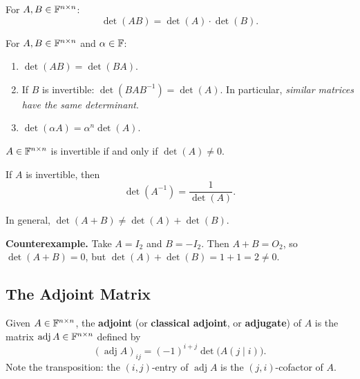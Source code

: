 \begin{propbox}
\label{prop:det-product}
For $A,B\in\mathbb{F}^{n\times n}$:
\[
    \det(AB) = \det(A)\cdot\det(B).
\]
\end{propbox}

\begin{corbox}
\label{cor:det-properties}
For $A,B\in\mathbb{F}^{n\times n}$ and $\alpha\in\mathbb{F}$:
\begin{enumerate}[label=\textbf{(\roman*)}]
    \item $\det(AB)=\det(BA)$.
    \item If $B$ is invertible: $\det(BAB^{-1})=\det(A)$.  In particular,
          \emph{similar matrices have the same determinant}.
    \item $\det(\alpha A)=\alpha^n\det(A)$.
\end{enumerate}
\end{corbox}

\begin{propbox}
\label{prop:det-invertible}
$A\in\mathbb{F}^{n\times n}$ is invertible if and only if $\det(A)\neq 0$.
\end{propbox}

\begin{corbox}
If $A$ is invertible, then
\[
    \det(A^{-1}) = \frac{1}{\det(A)}.
\]
\end{corbox}

\begin{warnbox}
In general, $\det(A+B)\neq\det(A)+\det(B)$.

\smallskip\noindent
\textbf{Counterexample.} Take $A=I_2$ and $B=-I_2$.  Then
$A+B=O_2$, so $\det(A+B)=0$, but $\det(A)+\det(B)=1+1=2\neq 0$.
\end{warnbox}

\subsection{The Adjoint Matrix}

\begin{defbox}
\label{def:adjoint}
Given $A\in\mathbb{F}^{n\times n}$, the \textbf{adjoint} (or \textbf{classical
adjoint}, or \textbf{adjugate}) of $A$ is the matrix
$\operatorname{adj}A\in\mathbb{F}^{n\times n}$ defined by
\[
    (\operatorname{adj}A)_{ij} = (-1)^{i+j}\det\!\bigl(A(j\mid i)\bigr).
\]
Note the transposition: the $(i,j)$-entry of $\operatorname{adj}A$ is the
$(j,i)$-cofactor of $A$.
\end{defbox}


